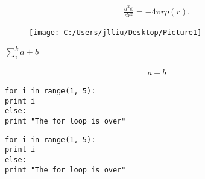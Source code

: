 \documentclass{article}
\begin{document}
\begin{align}
\frac{d^2\phi}{dr^2}= -4\pi r\rho(r).
\end{align}




\newpage
\begin{figure}[h]
	\centering
	\texttt{[image: C:/Users/jlliu/Desktop/Picture1]}
	\caption{}
	\label{fig:Picture1}
\end{figure}

$\sum_i^k{a+b}$ 

\begin{align*}
a+b
\end{align*}



\begin{verbatim}
for i in range(1, 5):
print i
else:
print "The for loop is over"
\end{verbatim}



\begin{lstlisting}[frame=single]  
for i in range(1, 5):
print i
else:
print "The for loop is over"
\end{lstlisting}
\end{document}
